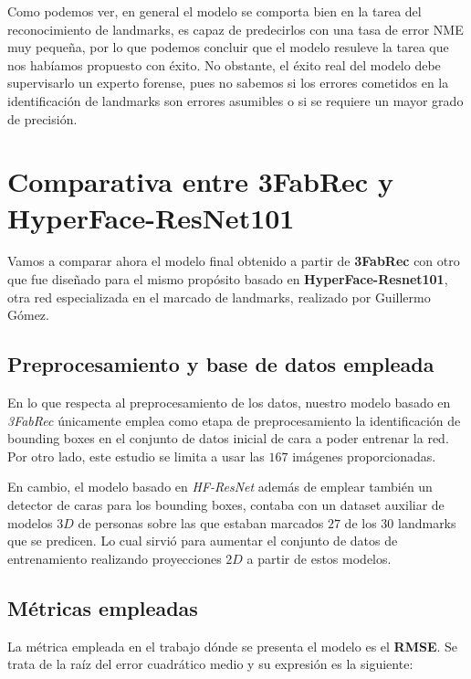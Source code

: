         \medskip

        \noindent Como podemos ver, en general el modelo se comporta bien en la tarea del reconocimiento de landmarks, es capaz de predecirlos con una tasa de error NME muy pequeña, por lo que podemos concluir que el modelo resuleve la tarea que nos habíamos propuesto con éxito. No obstante, el éxito real del modelo debe supervisarlo un experto forense, pues no sabemos si los errores cometidos en la identificación de landmarks son errores asumibles o si se requiere un mayor grado de precisión.

    \section{Comparativa entre 3FabRec y HyperFace-ResNet101}
        \noindent Vamos a comparar ahora el modelo final obtenido a partir de \textbf{3FabRec} con otro que fue diseñado para el mismo propósito basado en \textbf{HyperFace-Resnet101}, otra red especializada en el marcado de landmarks, realizado por Guillermo Gómez.

        \subsection{Preprocesamiento y base de datos empleada}
            \noindent En lo que respecta al preprocesamiento de los datos, nuestro modelo basado en \textit{3FabRec} únicamente emplea como etapa de preprocesamiento la identificación de bounding boxes en el conjunto de datos inicial de cara a poder entrenar la red. Por otro lado, este estudio se limita a usar las $167$ imágenes proporcionadas.

            \medskip

            \noindent En cambio, el modelo basado en \textit{HF-ResNet} además de emplear también un detector de caras para los bounding boxes, contaba con un dataset auxiliar de modelos $3D$ de personas sobre las que estaban marcados $27$ de los $30$ landmarks que se predicen. Lo cual sirvió para aumentar el conjunto de datos de entrenamiento realizando proyecciones $2D$ a partir de estos modelos.

        \subsection{Métricas empleadas}
            \noindent La métrica empleada en el trabajo dónde se presenta el modelo es el \textbf{RMSE}. Se trata de la raíz del error cuadrático medio y su expresión es la siguiente: 

